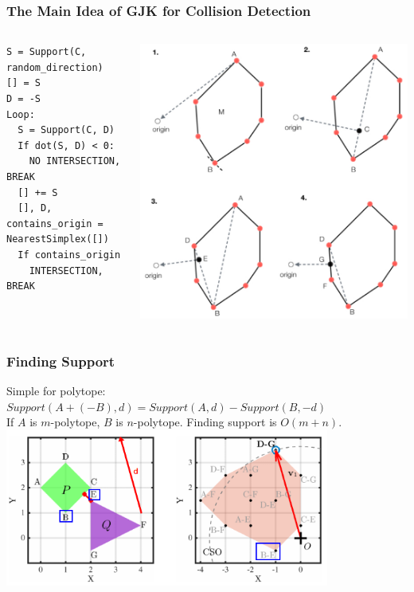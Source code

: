 \documentclass{beamer}
\begin{document}
\begin{frame}[fragile]%
\frametitle{The Main Idea of GJK for \textbf{Collision Detection}}
  \begin{columns}

{\tiny
\begin{verbatim}
S = Support(C, random_direction)
[] = S
D = -S
Loop:
  S = Support(C, D)
  If dot(S, D) < 0:
    NO INTERSECTION, BREAK
  [] += S
  [], D, contains_origin = NearestSimplex([])
  If contains_origin
    INTERSECTION, BREAK
\end{verbatim}
}

      \includegraphics[width=\textwidth]{images/g7}
  \end{columns}
\end{frame}

\begin{frame}
\frametitle{Finding Support}
  Simple for polytope:\\
  $Support(A+(-B), d) = Support(A, d)-Support(B, -d)$\\
  If $A$ is $m$-polytope, $B$ is $n$-polytope. Finding support is $O(m+n)$.\\
  \includegraphics[width=0.8\textwidth]{images/g10}
\end{frame}
\end{document}

